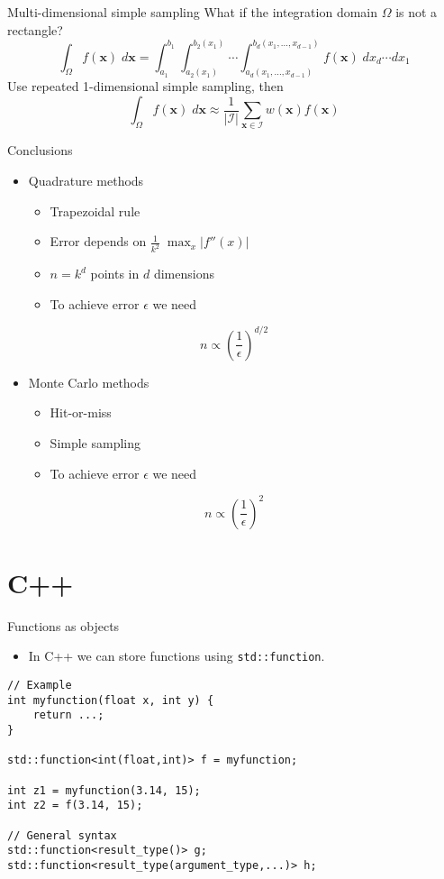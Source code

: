 \documentclass[10pt]{beamer}
\renewcommand{\vec}[1]{\mathbf{#1}}
\begin{document}
\begin{frame}[label={sec:orge728309}]{Multi-dimensional simple sampling}
What if the integration domain \(\Omega\) is not a rectangle?
$$\int_\Omega f(\vec{x})\;d\vec{x} = \int_{a_1}^{b_1} \int_{a_2(x_1)}^{b_2(x_1)} \cdots \int_{a_d(x_1,...,x_{d-1})}^{b_d(x_1,...,x_{d-1})} f(\vec{x}) \;dx_d \cdots dx_1$$
Use repeated 1-dimensional simple sampling, then
$$\int_\Omega f(\vec{x})\;d\vec{x} \approx \frac{1}{|\mathcal{I}|} \sum_{\vec{x}\in\mathcal{I}} w(\vec{x}) f(\vec{x})$$
\end{frame}

\begin{frame}[label={sec:org65ad1e8}]{Conclusions}
\begin{itemize}
\item Quadrature methods
\begin{itemize}
\item Trapezoidal rule
\item Error depends on \(\frac{1}{k^2}\;\max_x |f''(x)|\)
\item \(n = k^d\) points in \(d\) dimensions
\item To achieve error \(\epsilon\) we need
\end{itemize}
\end{itemize}
$$n \propto \left(\frac{1}{\epsilon}\right)^{d/2}$$
\begin{itemize}
\item Monte Carlo methods
\begin{itemize}
\item Hit-or-miss
\item Simple sampling
\item To achieve error \(\epsilon\) we need
\end{itemize}
\end{itemize}
$$n \propto \left(\frac{1}{\epsilon}\right)^{2}$$
\end{frame}
\section{C++}
\label{sec:org91eabf0}
\begin{frame}[fragile,label={sec:org3869e9d}]{Functions as objects}
 \begin{itemize}
\item In C++ we can store functions using \texttt{std::function}.
\end{itemize}

\begin{verbatim}
// Example
int myfunction(float x, int y) {
    return ...;
}

std::function<int(float,int)> f = myfunction;

int z1 = myfunction(3.14, 15);
int z2 = f(3.14, 15);

// General syntax
std::function<result_type()> g;
std::function<result_type(argument_type,...)> h;
\end{verbatim}
\end{frame}
\end{document}

